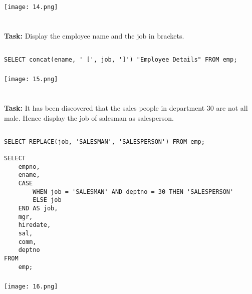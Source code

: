 \documentclass[12pt,a4paper]{article}
\begin{document}
\subsubsection{}
\begin{center}
    \texttt{[image: 14.png]}
\end{center}


\section{}
\textbf{Task:} Display the employee name and the job in brackets.

\subsection{}
\begin{lstlisting}
SELECT concat(ename, ' [', job, ']') "Employee Details" FROM emp;

\end{lstlisting}

\subsubsection{}
\begin{center}
    \texttt{[image: 15.png]}
\end{center}


\section{}
\textbf{Task:} It has been discovered that the sales people in department 30 are
not all male. Hence display the job of salesman as salesperson.

\subsection{}
\begin{lstlisting}
SELECT REPLACE(job, 'SALESMAN', 'SALESPERSON') FROM emp;

SELECT
    empno,
    ename,
    CASE
        WHEN job = 'SALESMAN' AND deptno = 30 THEN 'SALESPERSON'
        ELSE job
    END AS job,
    mgr,
    hiredate,
    sal,
    comm,
    deptno
FROM
    emp;

\end{lstlisting}

\subsubsection{}
\begin{center}
    \texttt{[image: 16.png]}
\end{center}
\end{document}
